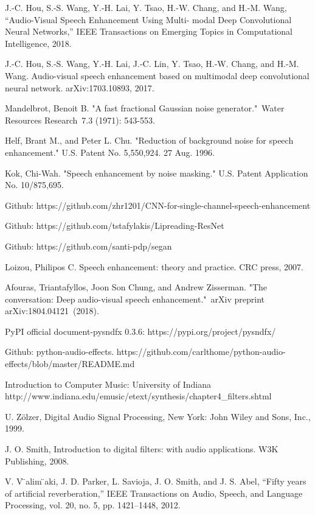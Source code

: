 \documentclass[runningheads,a4paper]{llncs}
\begin{document}
\begin{thebibliography}{4}
 J.-C. Hou, S.-S. Wang, Y.-H. Lai, Y. Tsao, H.-W. Chang, and H.-M. Wang, “Audio-Visual Speech Enhancement Using Multi- modal Deep Convolutional Neural Networks,” IEEE Transactions on Emerging Topics in Computational Intelligence, 2018.


 J.-C. Hou, S.-S. Wang, Y.-H. Lai, J.-C. Lin, Y. Tsao, H.-W. Chang, and H.-M. Wang. Audio-visual speech enhancement based on multimodal deep convolutional neural network. arXiv:1703.10893, 2017.

 Mandelbrot, Benoit B. "A fast fractional Gaussian noise generator." Water Resources Research 7.3 (1971): 543-553.

 Helf, Brant M., and Peter L. Chu. "Reduction of background noise for speech enhancement." U.S. Patent No. 5,550,924. 27 Aug. 1996.

 Kok, Chi-Wah. "Speech enhancement by noise masking." U.S. Patent Application No. 10/875,695.

 Github: https://github.com/zhr1201/CNN-for-single-channel-speech-enhancement

  Github: https://github.com/tstafylakis/Lipreading-ResNet

 Github: https://github.com/santi-pdp/segan

 Loizou, Philipos C. Speech enhancement: theory and practice. CRC press, 2007.

 Afouras, Triantafyllos, Joon Son Chung, and Andrew Zisserman. "The conversation: Deep audio-visual speech enhancement." arXiv preprint arXiv:1804.04121 (2018).

 PyPI official document-pysndfx 0.3.6: https://pypi.org/project/pysndfx/ 

 Github: python-audio-effects. https://github.com/carlthome/python-audio-effects/blob/master/README.md

 Introduction to Computer Music: University of Indiana
http://www.indiana.edu/emusic/etext/synthesis/chapter4_filters.shtml

 U. Zölzer, Digital Audio Signal Processing, 
New York: John Wiley and Sons, Inc., 1999.

 J. O. Smith, Introduction to digital filters: with audio applications. W3K Publishing, 2008.

 V. V ̈alim ̈aki, J. D. Parker, L. Savioja, J. O. Smith, and J. S. Abel, “Fifty years of artificial reverberation,” IEEE Transactions on Audio, Speech, and Language Processing, vol. 20, no. 5, pp. 1421–1448, 2012.


\end{thebibliography}
\end{document}
